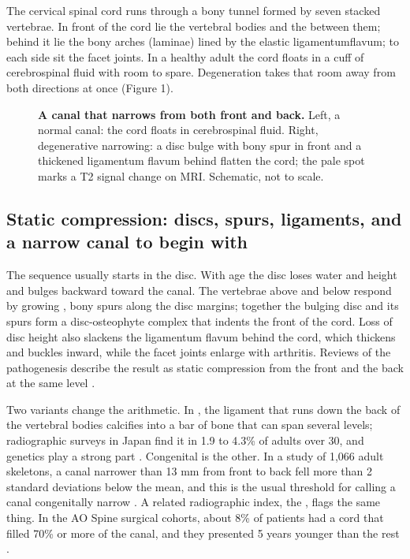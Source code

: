\documentclass[11pt, letterpaper]{article}
\begin{document}
The cervical spinal cord runs through a bony tunnel formed by seven stacked vertebrae. In front of the cord lie the vertebral bodies and the  between them; behind it lie the bony arches (laminae) lined by the elastic \gls{ligamentumflavum}; to each side sit the facet joints. In a healthy adult the cord floats in a cuff of cerebrospinal fluid with room to spare. Degeneration takes that room away from both directions at once (Figure 1).

\begin{figure}[!htb]
\centering

\caption{\textbf{A canal that narrows from both front and back.} Left, a normal canal: the cord floats in cerebrospinal fluid. Right, degenerative narrowing: a disc bulge with bony spur in front and a thickened ligamentum flavum behind flatten the cord; the pale spot marks a T2 signal change on MRI. Schematic, not to scale.}
\end{figure}

\subsection*{Static compression: discs, spurs, ligaments, and a narrow canal to begin with}

The sequence usually starts in the disc. With age the disc loses water and height and bulges backward toward the canal. The vertebrae above and below respond by growing , bony spurs along the disc margins; together the bulging disc and its spurs form a disc-osteophyte complex that indents the front of the cord. Loss of disc height also slackens the ligamentum flavum behind the cord, which thickens and buckles inward, while the facet joints enlarge with arthritis. Reviews of the pathogenesis describe the result as static compression from the front and the back at the same level \citep{karadimas2013,nouri2015}.

Two variants change the arithmetic. In , the ligament that runs down the back of the vertebral bodies calcifies into a bar of bone that can span several levels; radiographic surveys in Japan find it in 1.9 to 4.3\% of adults over 30, and genetics play a strong part \citep{matsunaga2012}. Congenital  is the other. In a study of 1,066 adult skeletons, a canal narrower than 13 mm from front to back fell more than 2 standard deviations below the mean, and this is the usual threshold for calling a canal congenitally narrow \citep{bajwa2012}. A related radiographic index, the , flags the same thing. In the AO Spine surgical cohorts, about 8\% of patients had a cord that filled 70\% or more of the canal, and they presented 5 years younger than the rest \citep{nouri2022}.
\end{document}
